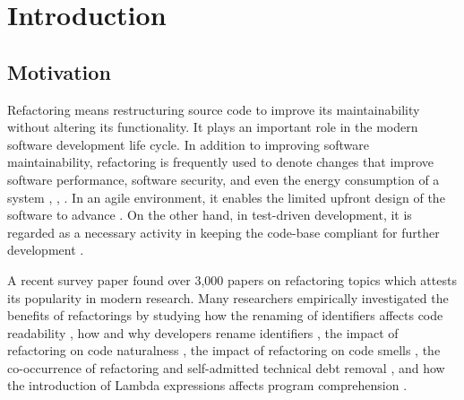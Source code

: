 \documentclass[letterpaper,12pt,onecolumn,final]{report}
\begin{document}
\chapter{Introduction}
\section{Motivation}
Refactoring means restructuring source code to improve its maintainability without altering its functionality. It plays an important role in the modern software development life cycle.
In addition to improving software maintainability, refactoring is frequently used to denote changes that improve software performance, software security, and even the energy consumption of a system \cite{almogahed2022refactoring}, \cite{da2010evaluation}, \cite{cruz2017leafactor}. In an agile environment, it enables the limited upfront design of the software to advance \cite{moser2007case}. On the other hand, in test-driven development, it is regarded as a necessary activity in keeping the code-base compliant for further development \cite{kumar2013comparative}. 

A recent survey paper \cite{abid202030} found over 3,000 papers on refactoring topics which attests its popularity in modern research. Many researchers empirically investigated the benefits of refactorings by studying how the renaming of identifiers affects code readability \cite{fakhoury2019improving}, how and why developers rename identifiers \cite{peruma2018empirical}, the impact of refactoring on code naturalness \cite{lin2019impact}, the impact of refactoring on code smells \cite{cedrim2017understanding}, the co-occurrence of refactoring and self-admitted technical debt removal \cite{iammarino2019self}, and how the introduction of Lambda expressions affects program comprehension \cite{lucas2019does}.
\end{document}
